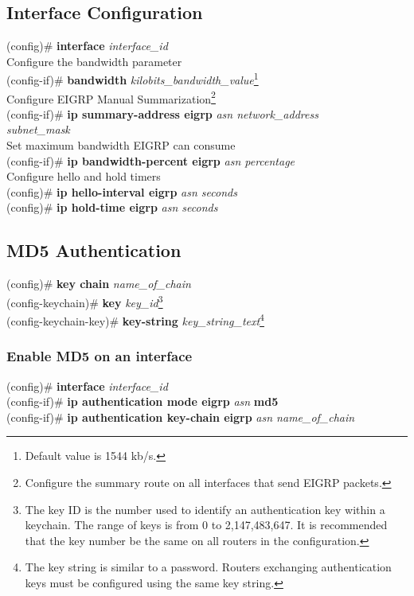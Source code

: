 \subsection{Interface Configuration}
(config)\# \textbf{interface} \textit{interface\_id}\vspace{11pt}\\
\textrm{Configure the bandwidth parameter}\\
(config-if)\# \textbf{bandwidth} \textit{kilobits\_bandwidth\_value}\footnote{Default value is 1544 kb/s.}\vspace{11pt}\\
\textrm{Configure EIGRP Manual Summarization}\footnote{Configure the summary route on all interfaces that send EIGRP packets.}\\
(config-if)\# \textbf{ip summary-address eigrp} \textit{asn network\_address \\subnet\_mask}\vspace{11pt}\\
\textrm{Set maximum bandwidth EIGRP can consume}\\
(config-if)\# \textbf{ip bandwidth-percent eigrp} \textit{asn percentage}\vspace{11pt}\\
\textrm{Configure hello and hold timers}\\
(config)\# \textbf{ip hello-interval eigrp} \textit{asn seconds}\\
(config)\# \textbf{ip hold-time eigrp} \textit{asn seconds}
\subsection{MD5 Authentication}
(config)\# \textbf{key chain} \textit{name\_of\_chain}\\
(config-keychain)\# \textbf{key} \textit{key\_id}\footnote{ The key ID is the number used to identify an authentication key within a keychain. The range of keys is from 0 to 2,147,483,647. It is recommended that the key number be the same on all routers in the configuration.}\\
(config-keychain-key)\# \textbf{key-string} \textit{key\_string\_text}\footnote{The key string is similar to a password. Routers exchanging authentication keys must be configured using the same key string.}
\subsubsection*{Enable MD5 on an interface}
(config)\# \textbf{interface} \textit{interface\_id}\\
(config-if)\# \textbf{ip authentication mode eigrp} \textit{asn} \textbf{md5}\\
(config-if)\# \textbf{ip authentication key-chain eigrp} \textit{asn name\_of\_chain}
